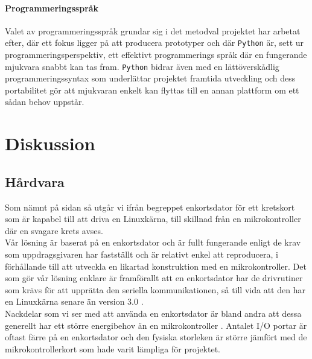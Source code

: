 \documentclass{article}
\begin{document}
            \paragraph{\textrm{Programmeringsspråk}} %
            \label{par:programmeringssprak}
               Valet av programmeringsspråk grundar sig i det metodval projektet har arbetat efter, där ett fokus ligger på att producera prototyper och där \texttt{Python} är, sett ur programmeringsperspektiv, ett effektivt programmerings språk där en fungerande mjukvara snabbt kan tas fram. \texttt{Python} bidrar även med en lättöverskådlig prog\-ram\-merings\-syntax som underlättar projektet framtida utveckling och dess portabilitet gör att mjukvaran enkelt kan flyttas till en annan plattform om ett sådan behov uppstår. 
        


    \newpage

    \section{Diskussion} %
    \label{sec:diskussion}
        \subsection{Hårdvara} %
        \label{sub:d_hardvara}
        
            Som nämnt på sidan \pageref{sub:beteckningar} så utgår vi ifrån begreppet enkortsdator för ett kretskort som är kapabel till att driva en Linuxkärna, till skillnad från en mikrokontroller där en svagare krets avses.\\

            \noindent Vår lösning är baserat på en enkortsdator och är fullt fungerande enligt de krav som uppdragsgivaren har fastställt och är relativt enkel att reproducera, i förhållande till att utveckla en likartad konstruktion med en mikrokontroller. Det som gör vår lösning enklare är framförallt att en enkortsdator har de drivrutiner som krävs för att upprätta den seriella kommunikationen, så till vida att den har en Linuxkärna senare än version 3.0 \cite{silicon}. \\

            \noindent Nackdelar som vi ser med att använda en enkortsdator är bland andra att dessa generellt har ett större energibehov än en mikrokontroller \cite{gadgetBlog, rasp}. Antalet I/O portar är oftast färre på en enkortsdator och den fysiska storleken är större jämfört med de mikrokontrollerkort som hade varit lämpliga för projektet.\\
\end{document}
